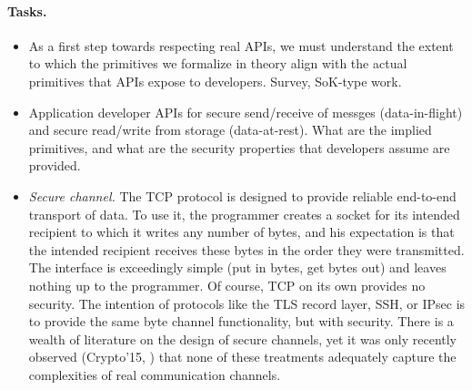 \paragraph{Tasks.} 
\begin{itemize}
\item As a first step towards respecting real APIs, we must understand the extent to
which the primitives we formalize in theory align with the actual primitives
that APIs expose to developers. {Survey, SoK-type work.}
\item {Application developer APIs for secure send/receive of messges
(data-in-flight) and secure read/write from storage (data-at-rest).  What are
the implied primitives, and what are the security properties that developers
assume are provided.}


  \item \emph{Secure channel.}
    The TCP protocol is designed to provide reliable end-to-end transport of
    data. To use it, the programmer creates a socket for its intended recipient
    to which it writes any number of bytes, and his expectation is that the
    intended recipient receives these bytes in the order they were transmitted.
    The interface is exceedingly simple (put in bytes, get bytes out) and leaves
    nothing up to the programmer. Of course, TCP on its own provides no
    security. The intention of protocols like the TLS record layer, SSH, or
    IPsec is to provide the same byte channel functionality, but with security.
    There is a wealth of literature on the design of secure channels, yet it was
    only recently observed (Crypto'15, \cite{fischlin2015data}) that none of
    these treatments adequately capture the complexities of real communication
    channels.


\end{itemize}
